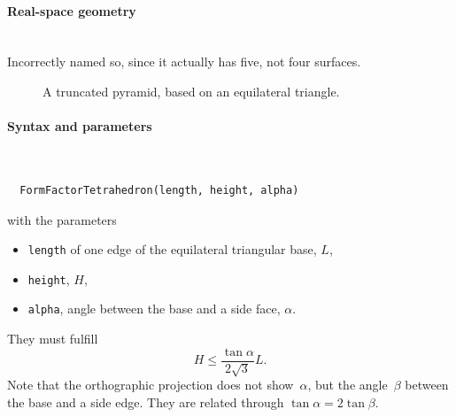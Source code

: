 \paragraph{Real-space geometry}\strut\\

\noindent
Incorrectly named so, since it actually has five, not four surfaces.


\begin{figure}[H]
\hfill
{}
\hfill
{}
\hfill
{}
\hfill
\caption{A truncated pyramid, based on an equilateral triangle.}
\end{figure}

\FloatBarrier

\paragraph{Syntax and parameters}\strut\\[-2ex plus .2ex minus .2ex]
\begin{lstlisting}
  FormFactorTetrahedron(length, height, alpha)
\end{lstlisting}
with the parameters
\begin{itemize}
\item \texttt{length} of one edge of the equilateral triangular base, $L$,
\item \texttt{height}, $H$,
\item \texttt{alpha}, angle between the base and a side face, $\alpha$.
\end{itemize}
They must fulfill
\begin{displaymath}
  H\le \frac{\tan{\alpha}}{2\sqrt{3}} L.
\end{displaymath}
Note that the orthographic projection does not show~$\alpha$,
but the angle~$\beta$ between the base and a side edge.
They are related through $\tan \alpha = 2 \tan \beta$.

